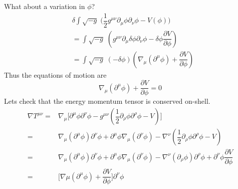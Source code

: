 \begin{ex}
What about a variation in $\phi $?
\begin{align*}
&\delta \int \sqrt{-g}\;\Big(\dfrac{1}{2}g^{\mu \nu }\partial _{\mu }\phi \partial _{\nu }\phi-V(\phi ) \Big)\\
&=\int \sqrt{-g}\;(g^{\mu \nu }\partial _{\mu }\delta \phi \partial _{\nu }\phi -\delta \phi \dfrac{\partial V}{\partial \phi } )\\
&=\int \sqrt{-g}\;(-\delta \phi )(\nabla _{\mu }(\partial ^{\mu }\phi )+\dfrac{\partial V}{\partial \phi } )
\end{align*}
Thus the equations of motion are 
\[\nabla _{\mu }(\partial ^{\mu }\phi )+\dfrac{\partial V}{\partial \phi }=0 \]
Lets check that the energy momentum tensor is conserved on-shell.
\begin{align*}
	\nabla T^{\mu \nu }=&\nabla _{\mu }\Big[\partial ^{\mu }\phi \partial ^{\nu }\phi -g^{\mu \nu }(\dfrac{1}{2}\partial _{\rho }\phi \partial ^{\rho }\phi -V)\Big]\\
=&\nabla _{\mu }(\partial ^{\mu }\phi )\partial ^{\nu }\phi +\partial ^{\mu }\phi \nabla _{\mu }(\partial ^{\nu }\phi )-\nabla ^{\nu }(\dfrac{1}{2}\partial _{\rho }\phi \partial ^{\rho }\phi -V)\\
=&\nabla _{\mu }(\partial ^{\mu }\phi )\partial ^{\nu }\phi+\partial ^{\mu }\phi \nabla _{\mu }(\partial^{\nu }\phi )-\nabla ^{\nu }(\partial _{\rho }\phi )\partial ^{\rho }\phi +\partial ^{\nu }\phi \dfrac{\partial V}{\partial \phi }\\
=&\Big[\nabla \mu (\partial ^{\mu }\phi )+\dfrac{\partial V}{\partial \phi } \Big]\partial ^{\nu }\phi 
\end{align*}
\end{ex}
\vspace{2ex}
